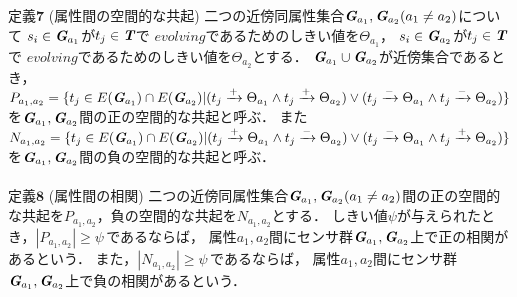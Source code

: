 \documentclass[11pt,j4a]{jarticle}
\begin{document}
\\\\
$\textbf{定義7}$ \hspace{2pt} ($\textbf{属性間の空間的な共起}$) \hspace{2pt}
二つの近傍同属性集合$\textit{\textbf{G}}_{a_{1}},\textit{\textbf{G}}_{a_{2}}(a_{1} \neq a_{2})$について
$s_{i} \in \textit{\textbf{G}}_{a_{1}}$が$t_{j} \in \textit{\textbf{T}}$で
$evolving$であるためのしきい値を$\Theta_{a_{1}}$，
$s_{i} \in \textit{\textbf{G}}_{a_{2}}$が$t_{j} \in \textit{\textbf{T}}$で
$evolving$であるためのしきい値を$\Theta_{a_{2}}$とする．
$\textit{\textbf{G}}_{a_{1}} \cup \textit{\textbf{G}}_{a_{2}}$が近傍集合であるとき，
$P_{a_{1},a_{2}}=\{t_{j} \in E(\textit{\textbf{G}}_{a_{1}}) \cap E(\textit{\textbf{G}}_{a_{2}})|
(t_{j} \xrightarrow{+} \Theta_{a_{1}} \land t_{j} \xrightarrow{+} \Theta_{a_{2}}) \lor
(t_{j} \xrightarrow{-} \Theta_{a_{1}} \land t_{j} \xrightarrow{-} \Theta_{a_{2}})\}$
を$\textit{\textbf{G}}_{a_{1}},\textit{\textbf{G}}_{a_{2}}$間の正の空間的な共起と呼ぶ．
また$N_{a_{1},a_{2}}=\{t_{j} \in E(\textit{\textbf{G}}_{a_{1}}) \cap E(\textit{\textbf{G}}_{a_{2}})|
(t_{j} \xrightarrow{+} \Theta_{a_{1}} \land t_{j} \xrightarrow{-} \Theta_{a_{2}}) \lor
(t_{j} \xrightarrow{-} \Theta_{a_{1}} \land t_{j} \xrightarrow{+} \Theta_{a_{2}})\}$
を$\textit{\textbf{G}}_{a_{1}},\textit{\textbf{G}}_{a_{2}}$間の負の空間的な共起と呼ぶ．
\\\\
$\textbf{定義8}$ \hspace{2pt} ($\textbf{属性間の相関}$) \hspace{2pt}
二つの近傍同属性集合$\textit{\textbf{G}}_{a_{1}},\textit{\textbf{G}}_{a_{2}}(a_{1} \neq a_{2})$間の正の空間的な共起を$P_{a_{1},a_{2}}$，負の空間的な共起を$N_{a_{1},a_{2}}$とする．
しきい値$\psi$が与えられたとき，$|P_{a_{1},a_{2}}| \geq \psi \hspace{2pt}$であるならば，
属性$a_{1},a_{2}$間にセンサ群$\textit{\textbf{G}}_{a_{1}},\textit{\textbf{G}}_{a_{2}}$上で正の相関があるという．
また，$|N_{a_{1},a_{2}}| \geq \psi \hspace{2pt}$であるならば，
属性$a_{1},a_{2}$間にセンサ群$\textit{\textbf{G}}_{a_{1}},\textit{\textbf{G}}_{a_{2}}$上で負の相関があるという．
\end{document}
